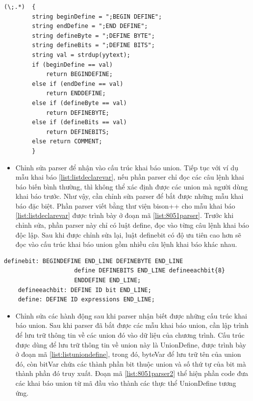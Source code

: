 \begin{changemargin}{0cm}{0cm} 
	\begin{lstlisting}[caption={Phần lexer được chỉnh sửa để nhận biết các chú thích đặc biệt},label={list:8051lexer}]
	(\;.*)  { 
		string beginDefine = ";BEGIN DEFINE";
		string endDefine = ";END DEFINE";
		string defineByte = ";DEFINE BYTE";
		string defineBits = ";DEFINE BITS";
		string val = strdup(yytext);
		if (beginDefine == val)
			return BEGINDEFINE;
		else if (endDefine == val)
			return ENDDEFINE;
		else if (defineByte == val)
			return DEFINEBYTE;
		else if (defineBits == val)
			return DEFINEBITS;
		else return COMMENT;
		}
	\end{lstlisting}

\end{changemargin} 
\begin{itemize}
	\item Chỉnh sửa parser để nhận vào cấu trúc khai báo union. Tiếp tục với ví dụ mẫu khai báo \ref{list:listdeclarevar}, nếu phần parser chỉ đọc các câu lệnh khai báo biến bình thường, thì không thể xác định được các union mà người dùng khai báo trước. Như vậy, cần chỉnh sửa parser để bắt được những mẫu khai báo đặc biệt. Phần parser viết bằng thư viện bison++ cho mẫu khai báo \ref{list:listdeclarevar} được trình bày ở đoạn mã \ref{list:8051parser}. Trước khi chỉnh sửa, phần parser này chỉ có luật define, đọc vào từng câu lệnh khai báo độc lập. Sau khi được chỉnh sửa lại, luật definebit có độ ưu tiên cao hơn sẽ đọc vào cấu trúc khai báo union gồm nhiều câu lệnh khai báo khác nhau.
\end{itemize}
\begin{changemargin}{0cm}{0cm} 
	\begin{lstlisting}[caption={Đoạn mã parser nhận biết các mẫu khai báo union},label={list:8051parser}]
	definebit: BEGINDEFINE END_LINE DEFINEBYTE END_LINE 
					define DEFINEBITS END_LINE defineeachbit{8} 
					ENDDEFINE END_LINE;
	defineeachbit: DEFINE ID bit END_LINE;
	define:	DEFINE ID expressions END_LINE;
	\end{lstlisting}
\end{changemargin} 
\begin{itemize}
	\item Chỉnh sửa các hành động sau khi parser nhận biết được những cấu trúc khai báo union. Sau khi parser đã bắt được các mẫu khai báo union, cần lập trình để lưu trữ thông tin về các union đó vào dữ liệu của chương trình. Cấu trúc được dùng để lưu trữ thông tin về union này là UnionDefine, được trình bày ở đoạn mã \ref{list:listuniondefine}, trong đó, byteVar để lưu trữ tên của union đó, còn bitVar chứa các thành phần bit thuộc union và số thứ tự của bit mà thành phần đó truy xuất. Đoạn mã \ref{list:8051parser2} thể hiện phần code đưa các khai báo union từ mã đầu vào thành các thực thể UnionDefine tương ứng.
\end{itemize}
